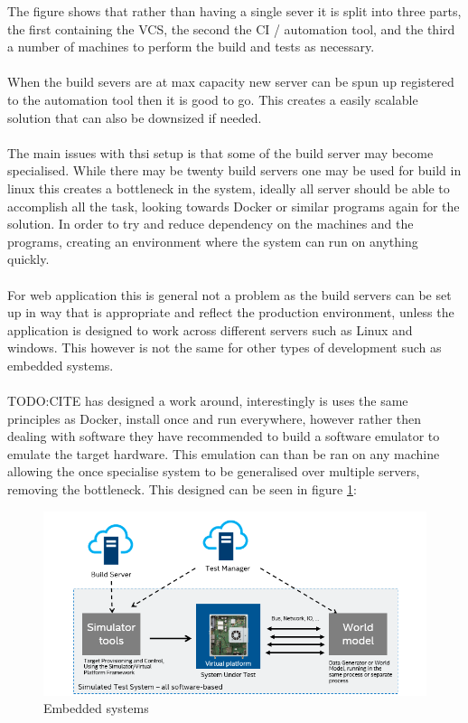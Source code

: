 The figure shows that rather than having a single sever it is split into three parts, the first containing the VCS, the second the CI / automation tool, and the third a number of machines to perform the build and tests as necessary.
\\\\
When the build severs are at max capacity new server can be spun up registered to the automation tool then it is good to go. This creates a easily scalable solution that can also be downsized if needed.
\\\\
The main issues with thsi setup is that some of the build server may become specialised. While there may be twenty build servers one may be used for build in linux this creates a bottleneck in the system, ideally all server should be able to accomplish all the task, looking towards Docker or similar programs again for the solution. In order to try and reduce dependency on the machines  and the programs, creating an environment where the system can run on anything quickly.
\\\\
For web application this is general not a problem as the build servers can be set up in way  that is appropriate and reflect the production environment, unless the application is designed to work across different servers such as Linux and windows. This however is not the same for other types of development such as embedded systems.
\\\\
TODO:CITE has designed a work around, interestingly is uses the same principles as Docker, install once and run everywhere, however rather then dealing with software they have recommended to build a software emulator to emulate the target hardware. This emulation can than be ran on any machine allowing the once specialise system to be generalised over multiple servers, removing the bottleneck. This designed can be seen in figure \ref{fig:intel}:

\begin{figure}[H]
	\centering
	\includegraphics[scale=0.7]{images/intel.png}
	\caption{Embedded systems \cite{intel}}
	\label{fig:intel}
\end{figure}

